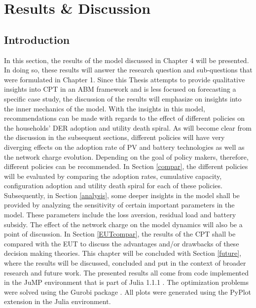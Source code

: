\chapter{Results \& Discussion}
\section{Introduction}
In this section, the results of the model discussed in Chapter 4 will be presented. In doing so, these results will answer the research question and sub-questions that were formulated in Chapter 1. Since this Thesis attempts to provide qualitative insights into CPT in an ABM framework and is less focused on forecasting a specific case study, the discussion of the results will emphasize on insights into the inner mechanics of the model. With the insights in this model, recommendations can be made with regards to the effect of different policies on the households' DER adoption and utility death spiral. As will become clear from the discussion in the subsequent sections, different policies will have very diverging effects on the adoption rate of PV and battery technologies as well as the network charge evolution. Depending on the goal of policy makers, therefore, different policies can be recommended. In Section \ref{compar}, the different policies will be evaluated by comparing the adoption rates, cumulative capacity, configuration adoption and utility death spiral for each of these policies. Subsequently, in Section \ref{analysis}, some deeper insights in the model shall be provided by analyzing the sensitivity of certain important parameters in the model. These parameters include the loss aversion, residual load and battery subsidy. The effect of the network charge on the model dynamics will also be a point of discussion. In Section \ref{EUTcompar}, the results of the CPT shall be compared with the EUT to discuss the advantages and/or drawbacks of these decision making theories. This chapter will be concluded with Section \ref{future}, where the results will be discussed, concluded and put in the context of broader research and future work.
\newline \newline \noindent
The presented results all come from code implemented in the JuMP environment that is part of Julia 1.1.1 \cite{julia}. The optimization problems were solved using the Gurobi package \cite{julia2}. All plots were generated using the PyPlot extension in the Julia environment.
